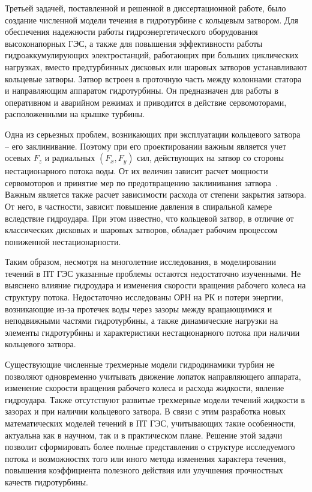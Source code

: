Третьей задачей, поставленной и решенной в диссертационной работе, было создание численной модели течения в
гидротурбине с кольцевым затвором. Для обеспечения надежности работы гидроэнергетического оборудования 
высоконапорных ГЭС, а также для повышения эффективности работы гидроаккумулирующих электростанций, 
работающих при больших циклических нагрузках, вместо предтурбинных дисковых или шаровых затворов устанавливают 
кольцевые затворы. 
Затвор встроен в проточную часть между колоннами статора и направляющим аппаратом гидротурбины. 
Он предназначен для работы в оперативном и аварийном режимах и приводится в действие сервомоторами, 
расположенными на крышке турбины.

Одна из серьезных проблем, возникающих при эксплуатации кольцевого затвора -- его заклинивание. 
Поэтому при его проектировании важным является учет осевых $F_z$ и радиальных $(F_x, F_y)$ сил, 
действующих на затвор со стороны нестационарного потока воды. 
От их величин зависит расчет мощности сервомоторов и принятие мер по 
предотвращению заклинивания затвора~\cite{shevch}. Важным является также расчет зависимости расхода от степени 
закрытия затвора. От него, в частности, зависит повышение давления в спиральной камере вследствие гидроудара. 
При этом известно, что кольцевой затвор, в отличие от классических дисковых и шаровых 
затворов, обладает рабочим процессом пониженной нестационарности.

Таким образом, несмотря на многолетние исследования, в моделировании течений в ПТ ГЭС указанные проблемы 
остаются недостаточно изученными. Не выяснено влияние гидроудара и изменения скорости вращения рабочего 
колеса на структуру потока. Недостаточно исследованы ОРН на РК и потери энергии, 
возникающие из-за протечек воды через зазоры между вращающимися и неподвижными частями гидротурбины, 
а также динамические нагрузки на элементы гидротурбины и характеристики нестационарного потока при 
наличии кольцевого затвора. 

Существующие численные трехмерные модели гидродинамики турбин не позволяют одновременно учитывать 
движение лопаток направляющего аппарата, изменение скорости вращения рабочего колеса и расхода жидкости, 
явление гидроудара. Также отсутствуют развитые трехмерные модели течений жидкости в зазорах и при наличии 
кольцевого затвора. В связи с этим разработка новых математических моделей течений в ПТ ГЭС, 
учитывающих такие особенности, актуальна как в научном, так и в 
практическом плане. Решение этой задачи позволит сформировать более полные представления 
о структуре исследуемого потока и возможностях того или иного метода изменения характера течения, 
повышения коэффициента полезного действия или улучшения прочностных качеств гидротурбины.

